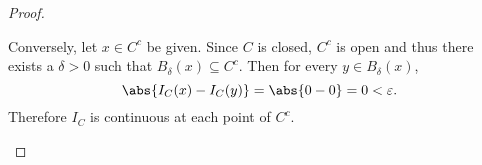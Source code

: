 \documentclass[12pt]{amsart}
\begin{document}
\begin{thm}
\begin{proof}
\begin{enumerate}[(a)]
      Conversely, let $x \in C^c$ be given.
      Since $C$ is closed, $C^c$ is open and thus there exists a $\delta > 0$ such that $B_\delta(x) \subseteq C^c$.
      Then for every $y \in B_\delta(x)$, $$\abs{I_C(x) - I_C(y) } = \abs{0 - 0} = 0 < \varepsilon.$$
      Therefore $I_C$ is continuous at each point of $C^c$.
    \end{enumerate}
  \end{proof}
\end{thm}
\end{document}
